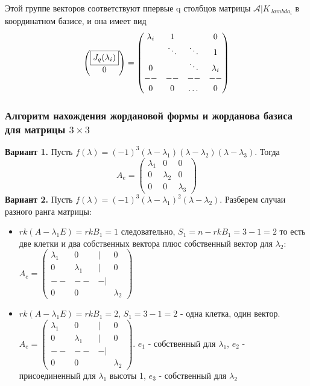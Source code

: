 Этой группе векторов соответствуют ппервые q столбцов матрицы $\mathcal A|K_{\
lambda_i}$ в координатном базисе, и она имеет вид
$$\begin{pmatrix}\boxed{J_q(\lambda_i)}\\0\end{pmatrix}=\begin{pmatrix}\lambda
_i&1&&\large{0}\\&\ddots&\ddots&1\\\large{0}&&\ddots&\lambda_i\\--&--&--&--\\0
&0&\dots&0\end{pmatrix}$$




\subsubsection{Алгоритм нахождения жордановой формы и жорданова базиса для
матрицы $3\times3$}
\textbf{Вариант 1.} Пусть $f(\lambda)=(-1)^3(\lambda-\lambda_1)
(\lambda-\lambda_2)(\lambda-\lambda_3)$. Тогда 
$$A_e=\begin{pmatrix}\boxed{\lambda_1}&0&0\\0&\boxed{\lambda_2}&0\\0&0&
\boxed{\lambda_3}\end{pmatrix}$$
\textbf{Вариант 2.} Пусть $f(\lambda)=(-1)^3(\lambda-\lambda_1)^2(\lambda-\lambda_2)$.
Разберем случаи разного ранга матрицы:
\begin{itemize}
    \item $rk(A-\lambda_1E)=rkB_1=1$ следовательно, $S_1=n-rkB_1=3-1=2$ то есть
			две клетки и два собственных вектора плюс собственный вектор для
			$\lambda_2$: $A_e=\begin{pmatrix}\lambda_1&0&|&0\\0&\lambda_1&
			|&0\\--&--&-|&\\0&0&&\boxed{\lambda_2}\end{pmatrix}$
    \item $rk(A-\lambda_1E)=rkB_1=2$, $S_1=3-1=2$ - одна клетка, один вектор.
		    $A_e=\begin{pmatrix}\lambda_1&0&|&0\\0&\lambda_1&|&0\\--&-
			-&-|&\\0&0&&\lambda_2\end{pmatrix}$. $e_1$ - собственный 
			для $\lambda_1$, $e_2$ - присоединенный для $\lambda_1$ 
			высоты 1, $e_3$ - собственный для  $\lambda_2$
\end{itemize}
